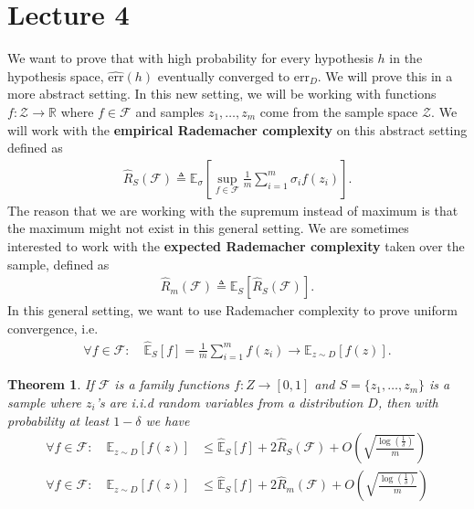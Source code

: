 \documentclass[10pt ]{article}
\newtheorem{thm}{Theorem}
\begin{document}
\section*{Lecture 4}
We want to prove that with high probability for every hypothesis $h$ in the hypothesis space, $\widehat{\mathrm{err}}(h) $ eventually converged to $\mathrm{err}_{D}$.  We will prove this in a more  abstract setting. In this new setting, we will be working with functions $f: \mathcal{Z} \to \mathbb{R}$ where $f \in \mathcal{F}$ and samples $z_1,\dots,z_m$ come from the sample space $\mathcal{Z}$. We will work with the \textbf{empirical Rademacher complexity} on this abstract setting defined as 
\begin{align}
\widehat{R}_S({\mathcal{F}}) \triangleq \mathbb{E}_{\sigma} \left[ \sup_{f \in \mathcal{F}} \frac{1}{m} \sum_{i=1}^m \sigma_i f(z_i) \right].
\label{eq_def_rademacher}
\end{align}
The reason that we are working with the supremum instead of maximum is that the maximum might not exist in this general setting. We are sometimes interested to work with the \textbf{expected  Rademacher complexity} taken over the sample, defined as  
\begin{align}
\widehat{R}_m({\mathcal{F}})\triangleq \mathbb{E}_{S} \left[ \widehat{R}_S({\mathcal{F}})  \right].
\end{align}
In this general setting, we want to use Rademacher complexity to prove uniform convergence, i.e. 
 \begin{align}
 \forall f \in \mathcal{F}: \quad \widehat{\mathbb{E}}_{S}\left[ f\right] = \frac{1}{m} \sum_{i=1}^m f(z_i) \to \mathbb{E}_{z \sim D} \left[ f(z) \right].
 \end{align}
\begin{thm}
{\em 
If $\mathcal{F}$ is a family functions $f: Z \to [0,1]$ and $S=\{z_1, \dots, z_m\}$ is a sample where $z_i$'s are i.i.d random variables from a distribution $D$, then with probability at least $1-\delta$ we have 
\begin{align}
 \forall f \in \mathcal{F}: \quad \mathbb{E}_{z \sim D} \left[ f(z) \right] &\le 
 \widehat{\mathbb{E}}_{S}\left[ f\right]  + 2 \widehat{R}_S({\mathcal{F}}) + O\left(\sqrt{\frac{\log(\frac{1}{\delta})}{m}} \right) \label{eq_thm_rademacher_1} \\
 \forall f \in \mathcal{F}: \quad \mathbb{E}_{z \sim D} \left[ f(z) \right] &\le 
 \widehat{\mathbb{E}}_{S}\left[ f\right]  + 2 \widehat{R}_m({\mathcal{F}}) + O\left(\sqrt{\frac{\log(\frac{1}{\delta})}{m}} \right) \label{eq_thm_rademacher_2}
\end{align}
}\label{thm_rademacher}
\end{thm}
\end{document}
